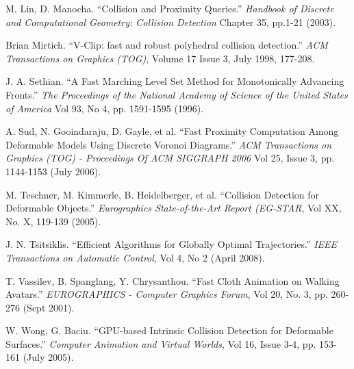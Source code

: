 \documentclass[9pt,twocolumn]{article}
\begin{document}
\begin{thebibliography}{9}
 M. Lin, D. Manocha. ``Collision and Proximity Queries.'' {\it Handbook of Discrete and Computational Geometry: Collision Detection} Chapter 35, pp.1-21 (2003). 

 Brian Mirtich. ``V-Clip: fast and robust polyhedral collision detection.'' \emph{ACM Transactions on Graphics (TOG)}, Volume 17 Issue 3, July 1998, 177-208.

 J. A. Sethian. ``A Fast Marching Level Set Method for Monotonically Advancing Fronts.''  {\it The Proceedings of the National Academy of Science of the United States of America} Vol 93, No 4, pp. 1591-1595 (1996).

 A. Sud, N. Gooindaraju, D. Gayle, et al. ``Fast Proximity Computation Among Deformable Models Using Discrete Voronoi Diagrams.'' {\it ACM Transactions on Graphics (TOG) - Proceedings Of ACM SIGGRAPH 2006} Vol 25, Issue 3, pp. 1144-1153 (July 2006).

 M. Teschner, M. Kimmerle, B. Heidelberger, et al. ``Collision Detection for Deformable Objects.'' {\it Eurographics State-of-the-Art Report (EG-STAR}, Vol XX, No. X, 119-139 (2005). 

 J. N. Tsitsiklis. ``Efficient Algorithms for Globally Optimal Trajectories.'' {\it IEEE Transactions on Automatic Control}, Vol 4, No 2 (April 2008).

 T. Vassilev, B. Spanglang, Y. Chrysanthou. ``Fast Cloth Animation on Walking Avatars.'' {\it EUROGRAPHICS - Computer Graphics Forum}, Vol 20, No. 3, pp. 260-276 (Sept 2001).

 W. Wong, G. Baciu. ``GPU-based Intrinsic Collision Detection for Deformable Surfaces.'' {\it Computer Animation and Virtual Worlds}, Vol 16, Issue 3-4, pp. 153-161 (July 2005). 

\end{thebibliography}
\end{document}
